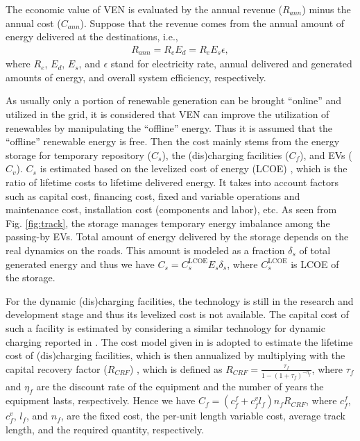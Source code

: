 \documentclass[journal]{IEEEtran}
\begin{document}
The economic value of VEN is evaluated by the annual revenue ($R_{ann}$) minus the annual cost ($C_{ann}$). Suppose that the revenue comes from the annual amount of energy delivered at the destinations, i.e.,
\begin{align*}
R_{ann} = R_{e}E_{d} = R_{e}E_{s} \epsilon,
\end{align*}
where $R_{e}$, $E_{d}$, $E_{s}$, and $\epsilon$ stand for electricity rate, annual delivered and generated amounts of energy, and overall system efficiency, respectively.

As usually only a portion of renewable generation can be brought ``online'' and utilized in the grid, it is considered that VEN can improve the utilization of renewables by manipulating the ``offline'' energy. Thus it is assumed that the ``offline'' renewable energy is free. Then the cost mainly stems from the energy storage for temporary repository ($C_{s}$), the (dis)charging facilities ($C_{f}$), and EVs ($C_{v}$). 
$C_{s}$ is estimated based on the levelized cost of energy (LCOE) \cite{storagecost}, which is the ratio of lifetime costs to lifetime delivered energy. It takes into account factors such as capital cost, financing cost, fixed and variable operations and maintenance cost, installation cost (components and labor), etc. As seen from Fig. \ref{fig:track}, the storage manages temporary energy imbalance among the passing-by EVs. Total amount of energy delivered by the storage depends on the real dynamics on the roads. This amount is modeled as a fraction $\delta_s$ of total generated energy and thus we have $C_s = C^{\text{LCOE}}_{s}E_s\delta_s$, where $C^{\text{LCOE}}_{s}$ is LCOE of the storage.
 
For the dynamic (dis)charging facilities, the technology is still in the research and development stage and thus its levelized cost is not available. The capital cost of such a facility is estimated by considering a similar technology for dynamic charging reported in \cite{EconDCEV}. The cost model given in \cite{EconDCEV} is adopted to estimate the lifetime cost of (dis)charging facilities, which is then annualized by multiplying with the capital recovery factor ($R_{CRF}$) \cite{V2Grevenue}, which is defined as $R_{CRF}=\frac{\tau_f}{1-(1+\tau_f)^{-\eta_f}}$, where $\tau_f$ and $\eta_f$ are the discount rate of the equipment and the number of years the equipment lasts, respectively. Hence we have $C_{f}= (c^f_f+c^{v}_fl_{f})n_{f}R_{CRF}$, where $c^f_f$, $c^v_f$, $l_{f}$, and  $n_f$, are the fixed cost, the per-unit length variable cost, average track length, and the required quantity, respectively. 
\end{document}

